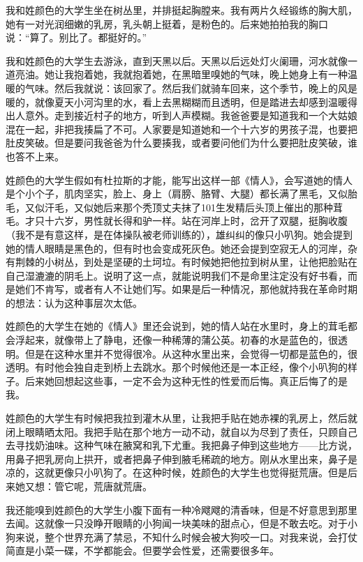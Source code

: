 我和姓颜色的大学生坐在树丛里，并排挺起胸膛来。我有两片久经锻练的胸大肌，她有一对光润细嫩的乳房，乳头朝上挺着，是粉色的。后来她拍拍我的胸口说：“算了。别比了。都挺好的。” 

我和姓颜色的大学生去游泳，直到天黑以后。天黑以后远处灯火阑珊，河水就像一道亮油。她让我抱着她，我就抱着她，在黑暗里嗅她的气味，晚上她身上有一种温暖的气味。然后我就说：该回家了。然后我们就骑车回来，这个季节，晚上的风是暖的，就像夏天小河沟里的水，看上去黑糊糊而且透明，但是踏进去却感到温暖得出人意外。走到接近村子的地方，听到人声模糊。我爸爸要是知道我和一个大姑娘混在一起，非把我揍扁了不可。人家要是知道她和一个十六岁的男孩子混，也要把肚皮笑破。但是要问我爸爸为什么要揍我，或者要问他们为什么要把肚皮笑破，谁也答不上来。 

姓颜色的大学生假如有杜拉斯的才能，能写出这样一部《情人》，会写道她的情人是个小个子，肌肉坚实，脸上、身上（肩膀、胳臂、大腿）都长满了黑毛，又似胎毛，又似汗毛，又似她后来那个秃顶丈夫抹了101生发精后头顶上催出的那种茸毛。才只十六岁，男性就长得和驴一样。站在河岸上时，岔开了双腿，挺胸收腹（我不是有意这样，是在体操队被老师训练的），雄纠纠的像只小叭狗。她会提到她的情人眼睛是黑色的，但有时也会变成死灰色。她还会提到空寂无人的河岸，杂有荆棘的小树丛，到处是坚硬的土坷垃。有时候她把他拉到树从里，让他把脸贴在自己湿漉漉的阴毛上。说明了这一点，就能说明我们不是命里注定没有好书看，而是她们不肯写，或者有人不让她们写。如果是后一种情况，那他就持我在革命时期的想法：认为这种事层次太低。 

姓颜色的大学生在她的《情人》里还会说到，她的情人站在水里时，身上的茸毛都会浮起来，就像带上了静电，还像一种稀薄的蒲公英。初春的水是蓝色的，很透明。但是在这种水里并不觉得很冷。从这种水里出来，会觉得一切都是蓝色的，很透明。有时他会独自走到桥上去跳水。那个时候他还是一本正经，像个小叭狗的样子。后来她回想起这些事，一定不会为这种无性的性爱而后悔。真正后悔了的是我。 

姓颜色的大学生有时候把我拉到灌木从里，让我把手贴在她赤裸的乳房上，然后就闭上眼睛晒太阳。我把手贴在那个地方一动不动，就自以为尽到了责任，只顾自己去寻找奶油味。这种气味在腋窝和乳下尤重。我把鼻子伸到这些地方——比方说，用鼻子把乳房向上拱开，或者把鼻子伸到腋毛稀疏的地方。刚从水里出来，鼻子是凉的，这就更像只小叭狗了。在这种时候，姓颜色的大学生也觉得挺荒唐。但是后来她又想：管它呢，荒唐就荒唐。 

我还能嗅到姓颜色的大学生小腹下面有一种冷飕飕的清香味，但是不好意思到那里去闻。这就像一只没睁开眼睛的小狗闻一块美味的甜点心，但是不敢去吃。对于小狗来说，整个世界充满了禁忌，不知什么时候会被大狗咬一口。对我来说，会打仗简直是小菜一碟，不学都能会。但要学会性爱，还需要很多年。 

